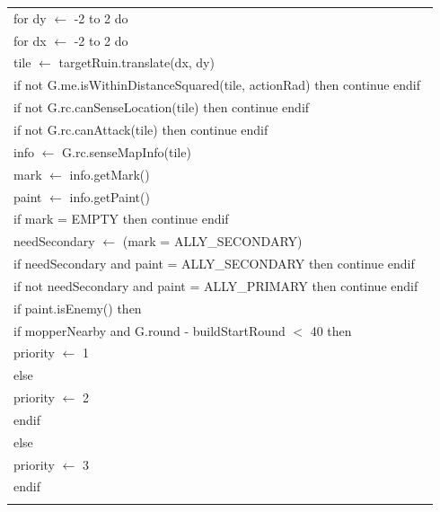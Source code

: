 \documentclass{article}
\newenvironment{pseudobox}
{
\centering
\begin{longtable}{|p{0.94\linewidth}|}
\hline
}
{
\\ \hline
\end{longtable}
\vspace{0.05cm}
}
\begin{document}
\begin{pseudobox}
\hspace*{1em} for dy $\leftarrow$ -2 to 2 do \\
\hspace*{2em} for dx $\leftarrow$ -2 to 2 do \\
\hspace*{3em} tile $\leftarrow$ targetRuin.translate(dx, dy) \\
\hspace*{3em} if not G.me.isWithinDistanceSquared(tile, actionRad) then continue endif \\
\hspace*{3em} if not G.rc.canSenseLocation(tile) then continue endif \\
\hspace*{3em} if not G.rc.canAttack(tile) then continue endif \\

\hspace*{3em} info $\leftarrow$ G.rc.senseMapInfo(tile) \\
\hspace*{3em} mark $\leftarrow$ info.getMark() \\
\hspace*{3em} paint $\leftarrow$ info.getPaint() \\

\hspace*{3em} if mark = EMPTY then continue endif \\

\hspace*{3em} needSecondary $\leftarrow$ (mark = ALLY\_SECONDARY) \\

\hspace*{3em} if needSecondary and paint = ALLY\_SECONDARY then continue endif \\
\hspace*{3em} if not needSecondary and paint = ALLY\_PRIMARY then continue endif \\

\hspace*{3em} if paint.isEnemy() then \\
\hspace*{4em} if mopperNearby and G.round - buildStartRound $<$ 40 then \\
\hspace*{5em} priority $\leftarrow$ 1 \\
\hspace*{4em} else \\
\hspace*{5em} priority $\leftarrow$ 2 \\
\hspace*{4em} endif \\
\hspace*{3em} else \\
\hspace*{4em} priority $\leftarrow$ 3 \\
\hspace*{3em} endif \\


\end{pseudobox}
\end{document}
